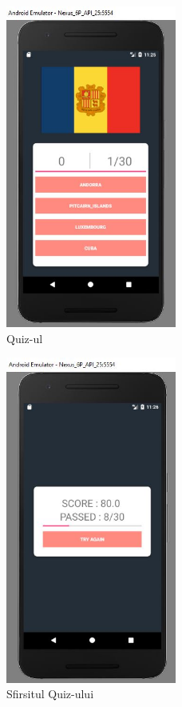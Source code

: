 \begin{figure}[!ht]
	
	\centering
	
	\includegraphics[width=0.5\textwidth]{Cattura1.JPG}
	
	\caption{Quiz-ul}
	
	\label{Im_label}
	
\end{figure}

\begin{figure}[!ht]
	
	\centering
	
	\includegraphics[width=0.5\textwidth]{Cattura2.JPG}
	
	\caption{Sfirsitul Quiz-ului}
	
	\label{Im_label}
	
\end{figure}


\clearpage